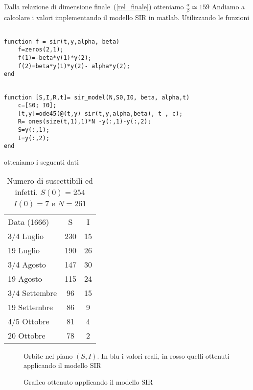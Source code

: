 Dalla relazione di dimensione finale~(\ref{rel_finale}) otteniamo $\frac{\alpha}{\beta} \simeq 159$
\newpage
Andiamo a calcolare i valori implementando il modello SIR in matlab. Utilizzando le funzioni


\begin{lstlisting}
	
function f = sir(t,y,alpha, beta)
	f=zeros(2,1);
	f(1)=-beta*y(1)*y(2);
	f(2)=beta*y(1)*y(2)- alpha*y(2);
end
\end{lstlisting}
\begin{lstlisting}

function [S,I,R,t]= sir_model(N,S0,I0, beta, alpha,t)
	c=[S0; I0];
	[t,y]=ode45(@(t,y) sir(t,y,alpha,beta), t , c);
	R= ones(size(t,1),1)*N -y(:,1)-y(:,2);
	S=y(:,1);
	I=y(:,2);
end

\end{lstlisting}
otteniamo i seguenti dati 

\begin{table}[!h]
\centering
\caption{Numero di suscettibili ed infetti. $S(0) = 254$ $I(0) = 7$ e $N = 261$ }	
\label{table::2}
\begin{tabular}{l|c|c}

Data (1666) & S & I\\
\cline{1-3}
3/4 Luglio  & 230& 15\\
19 Luglio  & 190 & 26\\
3/4 Agosto  & 147& 30\\
19  Agosto  & 115& 24\\
3/4 Settembre  & 96&  15\\
19 Settembre  & 86& 9\\
4/5 Ottobre  & 81& 4\\
20 Ottobre  & 78& 2\\
 
\end{tabular}
\end{table}
\begin{figure}
\centering

\caption{Orbite nel piano $(S,I)$.  In blu i valori reali,  in rosso quelli ottenuti applicando il modello SIR}
\end{figure}

\begin{figure}
\centering

\caption{Grafico ottenuto applicando il modello SIR}
\end{figure}
